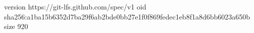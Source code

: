 version https://git-lfs.github.com/spec/v1
oid sha256:a1ba15b6352d7ba29f6ab2bde0bb27e1f0f869fedec1eb8f1a8d6bb6023a650b
size 920
